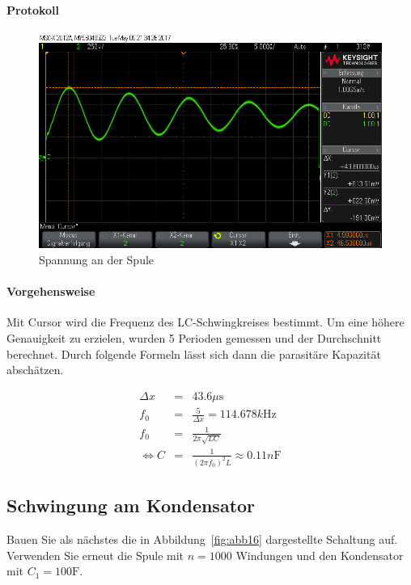 \documentclass[10pt]{scrreprt}
\begin{document}
        \paragraph{Protokoll}
        \begin{center}
            \begin{figure}[H]
                \includegraphics[width=\textwidth]{scope_9.png}
                \caption{Spannung an der Spule}
            \end{figure}
        \end{center}

        \paragraph{Vorgehensweise}
        Mit Cursor wird die Frequenz des LC-Schwingkreises bestimmt. Um eine höhere
        Genauigkeit zu erzielen, wurden 5 Perioden gemessen und der Durchschnitt
        berechnet. Durch folgende Formeln lässt sich dann die parasitäre Kapazität
        abschätzen.

        \begin{eqnarray}
            \Delta x &=& 43.6\si{\mu\second}\\
            f_0 &=& \frac{5}{\Delta x} = 114.678\si{k\hertz}\\
            f_0 &=& \frac{1}{2 \pi \sqrt{L C}}\\
            \Leftrightarrow C &=& \frac{1}{{(2 \pi f_0)}^2 L} \approx 0.11\si{n\farad}
        \end{eqnarray}

        \subsection{Schwingung am Kondensator}
        Bauen Sie als nächstes die in Abbildung~\ref{fig:abb16} dargestellte Schaltung auf. Verwenden
        Sie erneut die Spule mit $n = 1000$ Windungen und den Kondensator mit $C_1 =
        100 \si{\farad}$.
\end{document}
